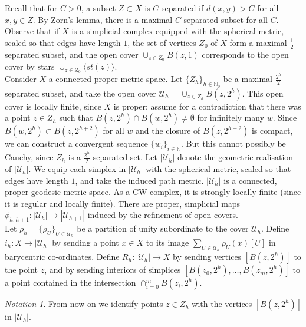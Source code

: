 \documentclass[a4paper,11pt]{article}
\theoremstyle{definition}
\theoremstyle{plain}
\theoremstyle{remark}
\newtheorem*{notation}{Notation}
\begin{document}
{Recall that for $C>0$, a subset $Z\subset X$ is $C$-separated if $d(x,y)>C$ for all $x,y\in Z$. By Zorn's lemma, there is a maximal $C$-separated subset for all $C$. Observe that if $X$ is a simplicial complex equipped with the spherical metric, scaled so that edges have length $1$, the set of vertices $Z_{0}$ of $X$ form a maximal $\frac{1}{2}$-separated subset, and the open cover $\cup_{z\in Z_{0}} B(z,1)$ corresponds to the open cover by stars $\cup_{z\in Z_{0}} \langle st(z)\rangle $.\\

Consider $X$ a connected proper metric space. Let $\{Z_{h}\}_{h\in \mathbb{N}_{0}}$ be a maximal $\frac{2^h}{2}$-separated subset, and take the open cover $\mathcal{U}_{h} = \cup_{z\in Z_{h}} B(z,2^h)$. This open cover is locally finite, since $X$ is proper: assume for a contradiction that there was a point $z \in Z_{h}$ such that $B(z,2^{h}) \cap B(w,2^h) \neq \emptyset$ for infinitely many $w$. Since  $B(w,2^h)\subset B(z,2^{h+2})$ for all $w$ and the closure of $B(z,2^{h+2})$ is compact, we can construct a convergent sequence $\{w_{i}\}_{i\in \mathbb{N}}$. But this cannot possibly be Cauchy, since $Z_{h}$ is a $\frac{2^h}{2}$-separated set. Let $|\mathcal{U}_{h}|$ denote the geometric realisation of $|\mathcal{U}_{h}|$.  We equip each simplex in $|\mathcal{U}_{h}|$ with the spherical metric, scaled so that edges have length $1$, and take the induced path metric. $|\mathcal{U}_{h}|$ is a connected, proper geodesic metric space. As a CW complex, it is strongly locally finite (since it is regular and locally finite). There are proper, simplicial maps $\phi_{h,h+1}: |\mathcal{U}_{h}|\rightarrow |\mathcal{U}_{h+1}|$ induced by the refinement of open covers. \\


Let $\rho_{h}= \{\rho_{U}\}_{U\in \mathcal{U}_{h}}$ be a partition of unity subordinate to the cover $\mathcal{U}_{h}$. Define $i_{h}: X\rightarrow |\mathcal{U}_{h}|$ by sending a point $x\in X$ to its image $\sum_{U\in \mathcal{U}_{h}}\rho_{U}(x) [U]$ in barycentric co-ordinates. Define $R_{h}: |\mathcal{U}_{h}| \rightarrow X$ by sending vertices $[B(z,2^{h})]$ to the point $z$, and by sending interiors of simplices $[B(z_0,2^{h}),\dots, B(z_m,2^{h})]$ to a point contained in the intersection $\cap_{i=0}^{m} B(z_i,2^{h})$. 

\begin{notation} From now on we identify points $z \in Z_{h}$ with the vertices $[B(z,2^h)]$ in $|\mathcal{U}_{h}|$. 
\end{notation}

}
\end{document}
